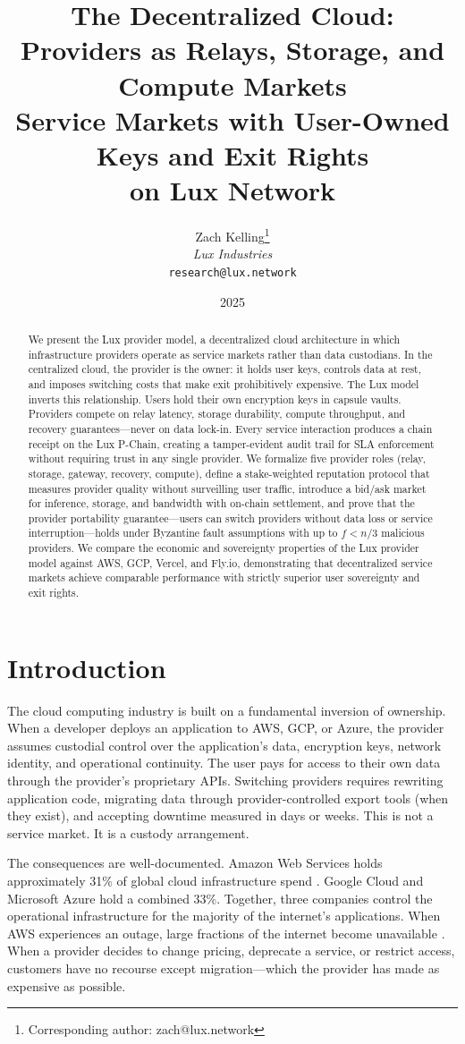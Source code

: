 \documentclass[11pt,a4paper]{article}
\title{\textbf{The Decentralized Cloud: Providers as Relays, Storage, and Compute Markets}\\[6pt]
\large Service Markets with User-Owned Keys and Exit Rights\\on Lux Network}
\author{
Zach Kelling\thanks{Corresponding author: zach@lux.network}\\
\textit{Lux Industries}\\
\texttt{research@lux.network}
}
\date{2025}
\begin{document}
\luxcoverpage

\begin{abstract}
We present the Lux provider model, a decentralized cloud architecture in which
infrastructure providers operate as service markets rather than data custodians.
In the centralized cloud, the provider is the owner: it holds user keys, controls
data at rest, and imposes switching costs that make exit prohibitively expensive.
The Lux model inverts this relationship. Users hold their own encryption keys in
capsule vaults. Providers compete on relay latency, storage durability, compute
throughput, and recovery guarantees---never on data lock-in. Every service
interaction produces a chain receipt on the Lux P-Chain, creating a tamper-evident
audit trail for SLA enforcement without requiring trust in any single provider.
We formalize five provider roles (relay, storage, gateway, recovery, compute),
define a stake-weighted reputation protocol that measures provider quality without
surveilling user traffic, introduce a bid/ask market for inference, storage, and
bandwidth with on-chain settlement, and prove that the provider portability
guarantee---users can switch providers without data loss or service interruption---holds
under Byzantine fault assumptions with up to $f < n/3$ malicious providers. We
compare the economic and sovereignty properties of the Lux provider model against
AWS, GCP, Vercel, and Fly.io, demonstrating that decentralized service markets
achieve comparable performance with strictly superior user sovereignty and exit rights.
\end{abstract}

\section{Introduction}\label{sec:intro}

The cloud computing industry is built on a fundamental inversion of ownership.
When a developer deploys an application to AWS, GCP, or Azure, the provider
assumes custodial control over the application's data, encryption keys, network
identity, and operational continuity. The user pays for access to their own data
through the provider's proprietary APIs. Switching providers requires rewriting
application code, migrating data through provider-controlled export tools (when
they exist), and accepting downtime measured in days or weeks. This is not a
service market. It is a custody arrangement.

The consequences are well-documented. Amazon Web Services holds approximately 31\%
of global cloud infrastructure spend \cite{synergy2024cloud}. Google Cloud and
Microsoft Azure hold a combined 33\%. Together, three companies control the
operational infrastructure for the majority of the internet's applications. When
AWS experiences an outage, large fractions of the internet become unavailable
\cite{aws2021outage}. When a provider decides to change pricing, deprecate a
service, or restrict access, customers have no recourse except migration---which
the provider has made as expensive as possible.
\end{document}
